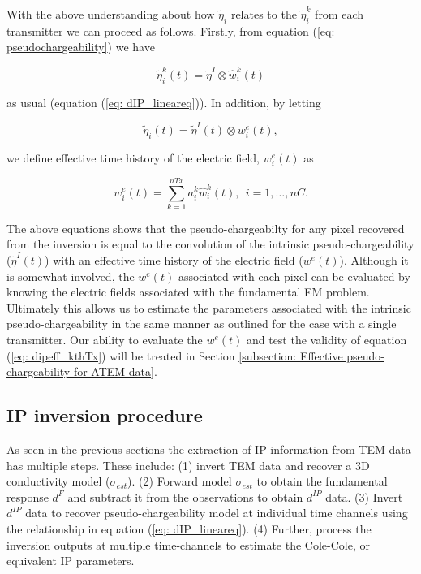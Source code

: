 \documentclass[extra,mreferee]{gji}
\newcommand{\peta}{\tilde{\eta}}
\newcommand{\dip}{d^{IP}}
\begin{document}
With the above understanding about how $\peta_i$ relates to the $\peta_i^k$ from each transmitter we can proceed  as follows. Firstly, from equation (\ref{eq: pseudochargeability}) we have 
\begin{linenomath*}
\begin{equation}
  \peta_i^k(t) =\peta^I \otimes \hat{w}^{k}_i(t) 
  \label{eq: peta_transmitters}
\end{equation}
\end{linenomath*}
as usual (equation (\ref{eq: dIP_lineareq})). 
In addition, by letting 
\begin{linenomath*}
\begin{equation}
  \peta_i(t) = \peta^I(t) \otimes w^e_i(t),
\end{equation}
\end{linenomath*}
we define effective time history of the electric field, $w^e_i(t)$ as 
\begin{linenomath*}
\begin{equation}
  w^e_i(t)= \sum_{k=1}^{nTx} a^k_i \hat{w}^{k}_i(t), \ \ i=1, \ldots, nC.
  \label{eq: we_eff}
\end{equation}
\end{linenomath*}

The above equations shows that the pseudo-chargeabilty for any pixel recovered from the inversion is equal to the convolution of the intrinsic pseudo-chargeability ($\peta^I(t)$) with an effective time history of the electric field ($w^e(t)$). Although it is somewhat involved, the $w^e(t)$ associated with each pixel can be evaluated by knowing the electric fields associated with the fundamental EM problem. Ultimately this allows us to estimate the parameters associated with the intrinsic pseudo-chargeability in the same manner as outlined for the case with a single transmitter. Our ability to evaluate the $w^e(t)$ and test the validity of equation (\ref{eq: dipeff_kthTx}) will be treated in Section \ref{subsection: Effective pseudo-chargeability for ATEM data}.  


\subsection{IP inversion procedure}
As seen in the previous sections the extraction of IP information from TEM data has multiple steps. These include: (1) invert TEM data and recover a 3D conductivity model ($\sigma_{est}$). 
(2) Forward model $\sigma_{est}$ to obtain the fundamental response $d^F$ and subtract it from the observations to obtain $\dip$ data.
(3) Invert  $\dip$ data to recover pseudo-chargeability model at individual time channels using the relationship in equation (\ref{eq: dIP_lineareq}). 
(4) Further, process the inversion outputs at multiple time-channels  to estimate the Cole-Cole, or equivalent IP parameters.
\end{document}
